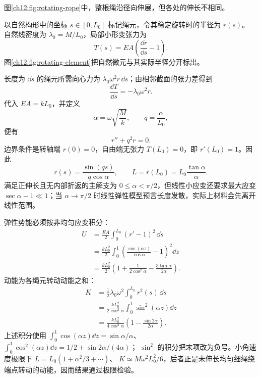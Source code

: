 \begin{xesolution}
图\ref{ch12:fig:rotating-rope}中，整根绳沿径向伸展，但各处的伸长不相同。


以自然构形中的坐标 $s\in[0,L_0]$ 标记绳元，令其稳定旋转时的半径为 $r(s)$。
自然线密度为 $\lambda_0=M/L_0$，局部小形变张力为
\[
 T(s)=EA\left(\frac{\dd r}{\dd s}-1\right).
\]
图\ref{ch12:fig:rotating-element}把自然微元与其实际半径分开标出。
\begin{center}\begin{minipage}{\linewidth}\centering
{}
\label{ch12:fig:rotating-element}
\end{minipage}\end{center}
长度为 $\dd s$ 的绳元所需向心力为 $\lambda_0\omega^2r\,\dd s$；由相邻截面的张力差得到
\[
 \frac{\dd T}{\dd s}=-\lambda_0\omega^2r.
\]
代入 $EA=kL_0$，并定义
\[
 \alpha=\omega\sqrt{\frac Mk},
 \qquad q=\frac\alpha{L_0},
\]
便有
\[
 r''+q^2r=0.
\]
边界条件是转轴端 $r(0)=0$，自由端无张力 $T(L_0)=0$，即 $r'(L_0)=1$。因此
\[
 r(s)=\frac{\sin(qs)}{q\cos\alpha},
 \qquad
 \boxed{L=r(L_0)=L_0\frac{\tan\alpha}{\alpha}}.
\]
满足正伸长且无内部折返的主解支为 $0\le\alpha<\pi/2$，但线性小应变还要求最大应变 $\sec\alpha-1\ll1$；当 $\alpha\to\pi/2$ 时线性弹性模型预言长度发散，实际上材料会先离开线性范围。

弹性势能必须按非均匀应变积分：
\begin{align*}
 U
 &=\frac{EA}{2}\int_0^{L_0}(r'-1)^2\,\dd s\\
 &=\frac{kL_0^2}{2}\int_0^1\left(\frac{\cos(\alpha z)}{\cos\alpha}-1\right)^2\dd z\\
 &=\boxed{\frac{kL_0^2}{2}
 \left(1+\frac{1}{2\cos^2\alpha}
 -\frac{3\tan\alpha}{2\alpha}\right)}.
\end{align*}
动能为各绳元转动动能之和：
\begin{align*}
 K
 &=\frac12\lambda_0\omega^2\int_0^{L_0}r^2(s)\,\dd s\\
 &=\frac{kL_0^2}{2\cos^2\alpha}\int_0^1\sin^2(\alpha z)\dd z\\
 &=\boxed{\frac{kL_0^2}{4\cos^2\alpha}
 \left(1-\frac{\sin2\alpha}{2\alpha}\right)}.
\end{align*}
上述积分使用
$\int_0^1\cos(\alpha z)\dd z=\sin\alpha/\alpha$、
$\int_0^1\cos^2(\alpha z)\dd z=1/2+\sin2\alpha/(4\alpha)$；
$\sin^2$ 的积分把末项改为负号。小角速度极限下 $L=L_0(1+\alpha^2/3+\cdots)$、
$K\simeq M\omega^2L_0^2/6$，后者正是未伸长均匀细绳绕端点转动的动能，因而结果通过极限检验。
\end{xesolution}

